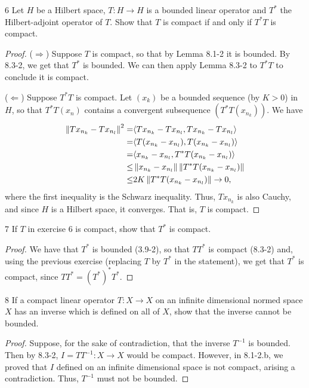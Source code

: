 \begin{exercise}{6}
Let $H$ be a Hilbert space, $T: H \to H$ is a bounded linear operator and $T^\ast$ the Hilbert-adjoint operator of $T$.
Show that $T$ is compact if and only if $T^\ast T$ is compact.
\end{exercise}
\begin{proof}
($\Rightarrow$)
Suppose $T$ is compact, so that by Lemma 8.1-2 it is bounded. 
By 8.3-2, we get that $T^\ast$ is bounded.
We can then apply Lemma 8.3-2 to $T^\ast T$ to conclude it is compact.

($\Leftarrow$)
Suppose $T^\ast T$ is compact.
Let $(x_k)$ be a bounded sequence (by $K > 0$) in $H$, so that $T^\ast T (x_n)$ contains a convergent subsequence $(T^\ast T (x_{n_k}))$.
We have 
\begin{align*}
    \left\lVert T x_{n_k} - T x_{n_l}\right\rVert^2
    =& \langle T x_{n_k} - T x_{n_l}, T x_{n_k} - T x_{n_l}\rangle\\
    =& \langle T (x_{n_k} - x_{n_l}), T (x_{n_k} - x_{n_l})\rangle\\
    =& \langle x_{n_k} - x_{n_l}, T^\ast T (x_{n_k} - x_{n_l})\rangle\\
    \leq& \left\lVert x_{n_k} - x_{n_l}\right\rVert \left\lVert T^\ast T (x_{n_k} - x_{n_l})\right\rVert\\
    \leq& 2K \left\lVert T^\ast T (x_{n_k} - x_{n_l})\right\rVert \to 0,
\end{align*}
where the first inequality is the Schwarz inequality.
Thus, $T x_{n_k}$ is also Cauchy, and since $H$ is a Hilbert space, it converges. 
That is, $T$ is compact.
\end{proof} 

\begin{exercise}{7}
If $T$ in exercise 6 is compact, show that $T^\ast$ is compact.
\end{exercise}
\begin{proof}
We have that $T^\ast$ is bounded (3.9-2), so that $T T^\ast$ is compact (8.3-2) and, using the previous exercise (replacing $T$ by $T^\ast$ in the statement), we get that $T^\ast$ is compact, since $T T^\ast = (T^\ast)^\ast T^\ast$.
\end{proof} 

\begin{exercise}{8}
If a compact linear operator $T: X \to X$ on an infinite dimensional normed space $X$ has an inverse which is defined on all of $X$, show that the inverse cannot be bounded.
\end{exercise}
\begin{proof}
Suppose, for the sake of contradiction, that the inverse $T^{-1}$ is bounded.
Then by 8.3-2, $I = T T^{-1}: X \to X$ would be compact.
However, in 8.1-2.b, we proved that $I$ defined on an infinite dimensional space is not compact, arising a contradiction.
Thus, $T^{-1}$ must not be bounded.
\end{proof} 

